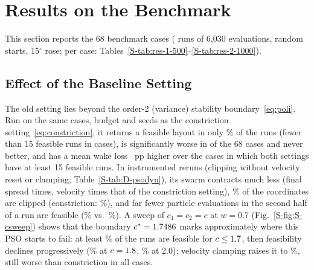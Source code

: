 \section{Results on the Benchmark}
\label{sec:results}
This section reports the 68 benchmark cases (\NRunsBenchmark{} runs of 6,030 evaluations, random starts, 15$^\circ$ rose; per case: Tables~\ref{S-tab:res-1-500}--\ref{S-tab:res-2-1000}).

\subsection{Effect of the Baseline Setting}
\label{sec:psosetting}
\label{sec:baseline}
The old setting lies beyond the order-2 (variance) stability boundary~\eqref{eq:poli}. Run on the same cases, budget and seeds as the constriction setting~\eqref{eq:constriction}, it returns a feasible layout in only \NOldPSOFeas\% of the runs (fewer than 15 feasible runs in \NOldPSOBelowHalf{} cases), is significantly worse in \NOldPSOWorse{} of the 68 cases and never better, and has a mean wake loss \NOldPSODL{}~pp higher over the \NOldPSOCases{} cases in which both settings have at least 15 feasible runs. In instrumented reruns (clipping without velocity reset or clamping; Table~\ref{S-tab:D-psodyn}), its swarm contracts much less (final spread \NDSpreadRatio{} times, velocity \NDVelRatio{} times that of the constriction setting), \NDClipOld\% of the coordinates are clipped (constriction: \NDClipNew\%), and far fewer particle evaluations in the second half of a run are feasible (\NDFeasPartOld\% vs.\ \NDFeasPartNew\%). A sweep of $c_1=c_2=c$ at $w=0.7$ (Fig.~\ref{S-fig:S-csweep}) shows that the boundary $c^\ast=1.7486$ marks approximately where this PSO starts to fail: at least \NSFeasBelow\% of the runs are feasible for $c\le1.7$, then feasibility declines progressively (\NSFeasAbove\% at $c=1.8$, \NSFeasCTwoZero\% at 2.0); velocity clamping raises it to \NSFeasVMax\%, still worse than constriction in all \NSLossCasesVMaxConstr{} cases.

